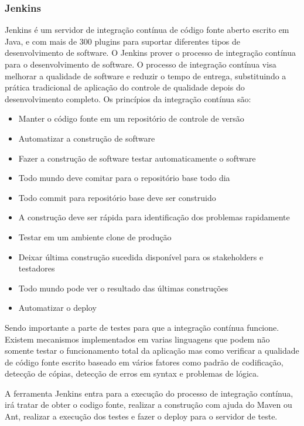 \documentclass[12pt,a4paper]{article}
\begin{document}
		\subsubsection{Jenkins}
			Jenkins é um servidor de integração contínua de código fonte aberto escrito em Java, e com mais de 300 plugins para
			suportar diferentes tipos de desenvolvimento de software. O Jenkins prover o processo de integração contínua para o
			desenvolvimento de software.
			O processo de integração contínua visa melhorar a qualidade de software e reduzir o tempo de entrega, substituindo a
			prática tradicional de aplicação do controle de qualidade depois do desenvolvimento completo. Os princípios da
			integração contínua são:
			\begin{itemize}
			  \item Manter o código fonte em um repositório de controle de versão
			  \item Automatizar a construção de software
			  \item Fazer a construção de software testar automaticamente o software
			  \item Todo mundo deve comitar para o repositório base todo dia
			  \item Todo commit para repositório base deve ser construido
			  \item A construção deve ser rápida para identificação dos problemas rapidamente
			  \item Testar em um ambiente clone de produção
			  \item Deixar última construção sucedida disponível para os stakeholders e testadores
			  \item Todo mundo pode ver o resultado das últimas construções
			  \item Automatizar o deploy
			\end{itemize}
			
			Sendo importante a parte de testes para que a integração contínua funcione. Existem mecanismos implementados em
			varias linguagens que podem não somente testar o funcionamento total da aplicação mas como verificar a qualidade de
			código fonte escrito baseado em vários fatores como padrão de codificação, detecção de cópias, detecção de erros em
			syntax e problemas de lógica.
			
			A ferramenta Jenkins entra para a execução do processo de integração contínua, irá tratar de obter o codigo fonte,
			realizar a construção com ajuda do Maven ou Ant, realizar a execução dos testes e fazer o deploy para o servidor de
			teste.
			
\end{document}
